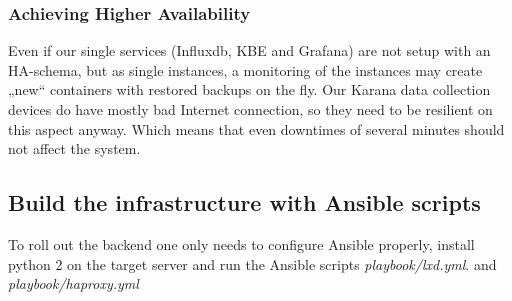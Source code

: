 \subsubsection{Achieving Higher Availability}
Even if our single services (Influxdb, KBE and Grafana) are not setup with an HA-schema, but as single instances, a monitoring of the instances may create „new“ containers with restored backups on the fly. Our Karana data collection devices do have mostly bad Internet connection, so they need to be resilient on this aspect anyway. Which means that even downtimes of several minutes should not affect the system.

\subsection{Build the infrastructure with Ansible scripts}
To roll out the backend one only needs to configure Ansible properly, install python 2 on the target server and run the Ansible scripts \textit{playbook/lxd.yml}. and \textit{playbook/haproxy.yml}

